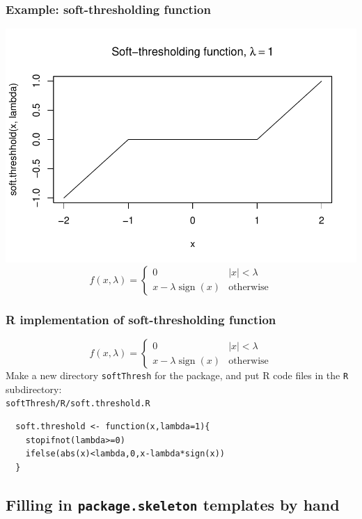 \documentclass{beamer}
\begin{document}
\begin{frame}\frametitle{Example: soft-thresholding function}
  \includegraphics[width=\textwidth]{soft-thresh}
  $$f(x,\lambda)=\begin{cases}
    0 & |x|<\lambda\\
    x-\lambda\operatorname{sign}(x) & \text{otherwise}
  \end{cases}$$
\end{frame}

\begin{frame}[containsverbatim]
  \frametitle{R implementation of soft-thresholding function}
    $$f(x,\lambda)=\begin{cases}
    0 & |x|<\lambda\\
    x-\lambda\operatorname{sign}(x) & \text{otherwise}
  \end{cases}$$
  Make a new directory \texttt{softThresh} for the package,
  and put R code files in the \texttt{R} subdirectory:\\
    \texttt{softThresh/R/soft.threshold.R}
    \hrulefill
  \begin{verbatim}
  soft.threshold <- function(x,lambda=1){
    stopifnot(lambda>=0)
    ifelse(abs(x)<lambda,0,x-lambda*sign(x))
  }
  \end{verbatim}
\end{frame}

\subsection{Filling in \texttt{package.skeleton} templates by hand}
\end{document}
